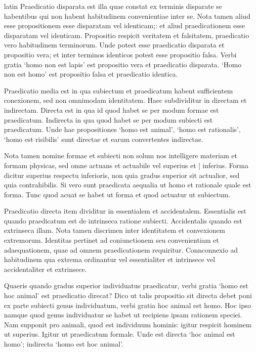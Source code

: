 \begin{otherlanguage*}{latin}
\pstart
  Praedicatio disparata est illa quae constat ex terminis disparate se habentibus qui non habent habitudinem convenientiae inter se. Nota tamen aliud esse propositionem esse disparatam vel identicam;: et aliud praedicationem esse disparatam vel identicam. Propositio respicit veritatem et falsitatem, praedicatio vero habitudinem terminorum. Unde potest esse praedicatio disparata et propositio vera; et inter terminos identicos potest esse propositio falsa. Verbi gratia `homo non est lapis' est propositio vera et praedicatio disparata. `Homo non est homo' est propositio falsa et praedicatio identica. 
\pend

\pstart
  Praedicatio media est in qua subiectum et praedicatum habent sufficientem conexionem, sed non omnimodam identitatem. Haec subdividitur in directam et indirectam. Directa est in qua id quod habet se per modum formae est praedicatum. Indirecta in qua quod habet se per modum subiecti est praedicatum. Unde hae propositiones `homo est animal', `homo est rationalis', `homo est risibilis' sunt directae et earum convertentes indirectae. 
\pend

\pstart
  Nota tamen nomine formae et subiecti non solum nos intelligere materiam et formam physicas, sed omne actuans et actuabile vel superius et \textnormal{|}   inferius. Forma dicitur superius respectu inferioris, non quia gradus superior sit actualior, sed quia contrahibilis. Si vero sunt praedicata aequalia ut homo et rationale quale est forma. Tunc quod acuat se habet ut forma et quod actuatur ut subiectum. 
\pend

\pstart
  Praedicatio directa item dividitur in essentialem et accidentalem. Essentialis est quando praedicatum est de intrinseca ratione subiecti. Accidentalis quando est extrinseca illam. Nota tamen discrimen inter identitatem et convexionem extremorum. Identitas pertinet ad coniunctionem seu convenientiam et adaequationem, quae ad omnem praedicationem requiritur. Connconnexio ad habitudinem qua extrema ordinantur vel essentialiter et intrinsece vel accidentaliter et extrinsece. 
\pend

\pstart
  Quaeris quando gradus superior individuatus praedicatur, verbi gratia `homo est hoc animal' est praedicatio direcat? Dico ut talis propositio sit directa debet poni ex parte subiecti genus individuatum, verbi gratia hoc animal est homo. Hoc ipso namque quod genus individuatur se habet ut recipiens ipsam rationem  speciei. Nam supponit pro animali, quod est individuum hominis: igitur respicit hominem ut superius. Igitur ut praedicatum formale. Unde est directa `hoc animal est homo'; indirecta `homo est hoc animal'. 
\pend


\end{otherlanguage*}
